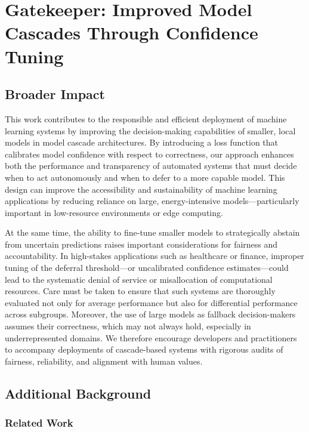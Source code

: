 \chapter{Gatekeeper: Improved Model Cascades Through Confidence Tuning}

\section{Broader Impact}
\label{sec:broader_impact}

This work contributes to the responsible and efficient deployment of machine learning systems by improving the decision-making capabilities of smaller, local models in model cascade architectures. By introducing a loss function that calibrates model confidence with respect to correctness, our approach enhances both the performance and transparency of automated systems that must decide when to act autonomously and when to defer to a more capable model. This design can improve the accessibility and sustainability of machine learning applications by reducing reliance on large, energy-intensive models—particularly important in low-resource environments or edge computing.

At the same time, the ability to fine-tune smaller models to strategically abstain from uncertain predictions raises important considerations for fairness and accountability. In high-stakes applications such as healthcare or finance, improper tuning of the deferral threshold—or uncalibrated confidence estimates—could lead to the systematic denial of service or misallocation of computational resources. Care must be taken to ensure that such systems are thoroughly evaluated not only for average performance but also for differential performance across subgroups. Moreover, the use of large models as fallback decision-makers assumes their correctness, which may not always hold, especially in underrepresented domains. We therefore encourage developers and practitioners to accompany deployments of cascade-based systems with rigorous audits of fairness, reliability, and alignment with human values.

\section{Additional Background}

\subsection{Related Work}
\label{sec:ext_rel_work}

